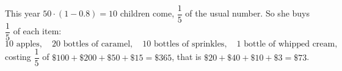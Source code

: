 This year $50\cdot(1-0.8)=10$ children come, $\dfrac15$ of the usual number. So she buys $\dfrac15$ of each item:
\[10\text{ apples},\quad20\text{ bottles of caramel},\quad10\text{ bottles of sprinkles},\quad1\text{ bottle of whipped cream},\]
costing $\dfrac15$ of $\$100+\$200+\$50+\$15=\$365$, that is $\$20+\$40+\$10+\$3=\boxed{\$73}$.
